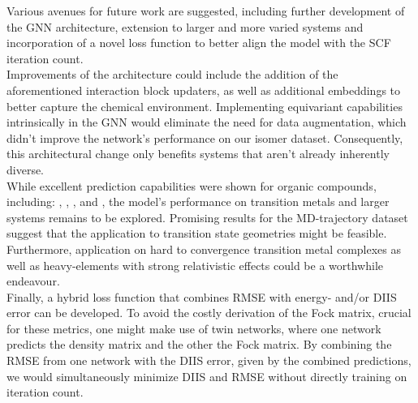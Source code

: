 Various avenues for future work are suggested, including further development of the GNN architecture, extension to larger and more varied systems and incorporation of a novel loss function to better align the model with the SCF iteration count. \\
Improvements of the architecture could include the addition of the aforementioned interaction block updaters, as well as additional embeddings to better capture the chemical environment. Implementing equivariant capabilities intrinsically in the GNN would eliminate the need for data augmentation, which didn't improve the network's performance on our isomer dataset. Consequently, this architectural change only benefits systems that aren't already inherently diverse.  \\
While excellent prediction capabilities were shown for organic compounds, including: , , ,  and , the model's performance on transition metals and larger systems remains to be explored. Promising results for the MD-trajectory dataset suggest that the application to transition state geometries might be feasible.
Furthermore, application on hard to convergence transition metal complexes as well as heavy-elements with strong relativistic effects could be a worthwhile endeavour. \\
Finally, a hybrid loss function that combines RMSE with energy- and/or DIIS error can be developed. To avoid the costly derivation of the Fock matrix, crucial for these metrics, one might make use of twin networks, where one network predicts the density matrix and the other the Fock matrix. By combining the RMSE from one network with the DIIS error, given by the combined predictions, we would simultaneously minimize DIIS and RMSE without directly training on iteration count.
